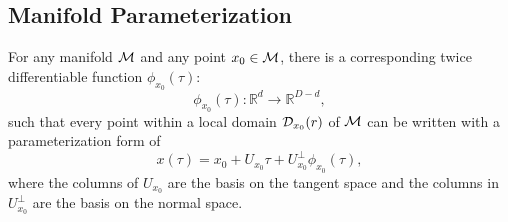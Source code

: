 \documentclass{article}
\theoremstyle{remark}
\begin{document}
\subsection{Manifold Parameterization}
For any manifold $\cal M$ and any point $x_0\in \cal M$, there is a corresponding twice differentiable function $\phi_{x_0}(\tau)$:
\[
\phi_{x_0}(\tau):{\mathbb R}^d\rightarrow {\mathbb R}^{D-d},
\]
such that every point within a local domain ${\cal D}_{x_0}(r)$ of $\cal M$ can be written with a parameterization form of 
\begin{equation}\label{manifold}
x(\tau)=  x_0 + U_{x_0} \tau+ U_{x_0}^{\perp} \phi_{x_0} (\tau),
\end{equation}
where the columns of $U_{x_0}$ are the basis on the tangent space and the columns in $U_{x_0}^{\perp}$ are the basis on the normal space. 

%
\end{document}
